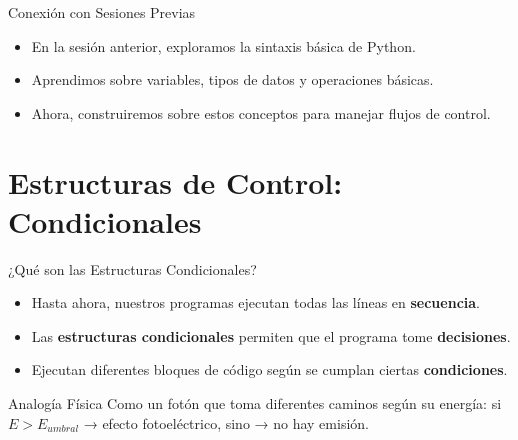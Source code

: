 \documentclass[10pt]{beamer}
\begin{document}
\begin{frame}{Conexión con Sesiones Previas}
  \begin{itemize}
    \item En la sesión anterior, exploramos la sintaxis básica de Python.
    \item Aprendimos sobre variables, tipos de datos y operaciones básicas.
    \item Ahora, construiremos sobre estos conceptos para manejar flujos de control.
  \end{itemize}
\end{frame}

\section{Estructuras de Control: Condicionales}

\begin{frame}{¿Qué son las Estructuras Condicionales?}
  \begin{itemize}
    \item Hasta ahora, nuestros programas ejecutan todas las líneas en \textbf{secuencia}.
    \item Las \textbf{estructuras condicionales} permiten que el programa tome \textbf{decisiones}.
    \item Ejecutan diferentes bloques de código según se cumplan ciertas \textbf{condiciones}.
  \end{itemize}
  
  \begin{block}{Analogía Física}
    Como un fotón que toma diferentes caminos según su energía: si \(E > E_{umbral}\) → efecto fotoeléctrico, sino → no hay emisión.
  \end{block}
\end{frame}
\end{document}
